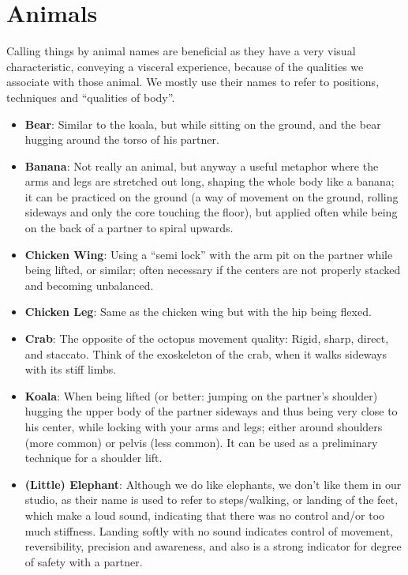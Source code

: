 \section{Animals}\label{sec:animals}

Calling things by animal names are beneficial as they have a very visual characteristic, conveying a visceral experience, because of the qualities we associate with those animal.
We mostly use their names to refer to positions, techniques and ``qualities of body''.

\begin{itemize}
    \item \textbf{Bear}: Similar to the koala, but while sitting on the ground, and the bear hugging around the torso of his partner.
    \item \textbf{Banana}: Not really an animal, but anyway a useful metaphor where the arms and legs are stretched out long, shaping the whole body like a banana; it can be practiced on the ground (a way of movement on the ground, rolling sideways and only the core touching the floor), but applied often while being on the back of a partner to spiral upwards.
    \item \textbf{Chicken Wing}: Using a ``semi lock'' with the arm pit on the partner while being lifted, or similar; often necessary if the centers are not properly stacked and becoming unbalanced.
    \item \textbf{Chicken Leg}: Same as the chicken wing but with the hip being flexed.
    \item \textbf{Crab}: The opposite of the octopus movement quality: Rigid, sharp, direct, and staccato.
    Think of the exoskeleton of the crab, when it walks sideways with its stiff limbs.
    \item \textbf{Koala}: When being lifted (or better: jumping on the partner's shoulder) hugging the upper body of the partner sideways and thus being very close to his center, while locking with your arms and legs; either around shoulders (more common) or pelvis (less common).
    It can be used as a preliminary technique for a shoulder lift.
    \item \textbf{(Little) Elephant}: Although we do like elephants, we don't like them in our studio, as their name is used to refer to steps/walking, or landing of the feet, which make a loud sound, indicating that there was no control and/or too much stiffness.
    Landing softly with no sound indicates control of movement, reversibility, precision and awareness, and also is a strong indicator for degree of safety with a partner.

\end{itemize}
